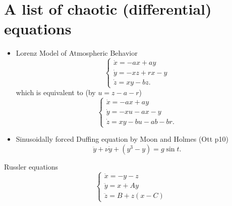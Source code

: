 \documentclass[11pt]{book}
\begin{document}
\section{A list of chaotic (differential) equations}
\begin{itemize}
  \item Lorenz Model of Atmospheric Behavior
    \begin{equation*}
     \begin{cases}
      \dot{x} = -ax + ay \\
      \dot{y} = -xz + rx -y \\
      \dot{z} = xy - bz.
    \end{cases}
    \end{equation*}
    which is equivalent to (by $u = z - a - r$)
    \begin{equation*}
     \begin{cases}
      \dot{x} = -ax + ay \\
      \dot{y} = -xu - ax -y \\
      \dot{z} = xy - bu -ab -br.
    \end{cases}
    \end{equation*}

  \item Sinusoidally forced Duffing equation by Moon and Holmes (Ott p10)
    \begin{equation*}
      \ddot{y} + \nu \dot{y} + (y^3 - y) = g\sin t.
    \end{equation*}
    \end{itemize}
\item Russler equations
  \begin{equation*}
    \begin{cases}
      \ddot{x} = - y - z \\
      \ddot{y} = x + Ay \\
      \ddot{z} = B + z(x - C)
    \end{cases}
  \end{equation*}



\end{document}

